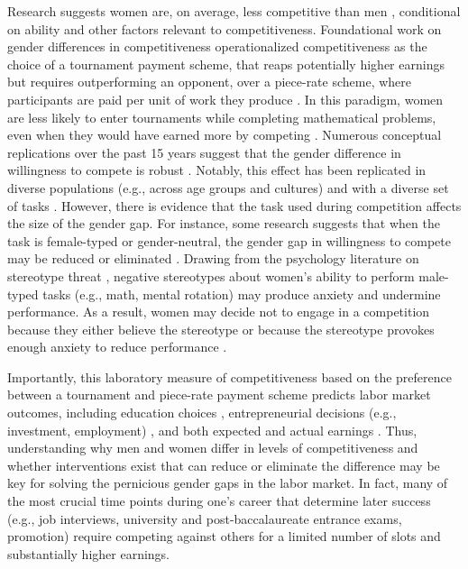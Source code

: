\documentclass[a4paper, nobind]{templates/ociamthesis}
\begin{document}
Research suggests women are, on average, less competitive than men \autocites[for review, see][]{Niederle2011,Croson2009,Niederle2017b,Shurchkov2018}, conditional on ability and other factors relevant to competitiveness. Foundational work on gender differences in competitiveness operationalized competitiveness as the choice of a tournament payment scheme, that reaps potentially higher earnings but requires outperforming an opponent, over a piece-rate scheme, where participants are paid per unit of work they produce \autocites{Niederle2007}[although see][ for an arguably more sensitive test of gender differences in competitiveness]{Saccardo2018}. In this paradigm, women are less likely to enter tournaments while completing mathematical problems, even when they would have earned more by competing \autocite{Niederle2007}. Numerous conceptual replications over the past 15 years suggest that the gender difference in willingness to compete is robust \autocites[see][ for review]{Niederle2011,Niederle2017a,Niederle2017b}. Notably, this effect has been replicated in diverse populations (e.g., across age groups and cultures) \autocite{Apicella2015,Buser2014,Sutter2016,Andersen2013,Buser2017b,Sutter2010,Dreber2014,Mayr2012} and with a diverse set of tasks \autocite{Apicella2015,Saccardo2018,Bjorvatn2016,Sutter2015,Frick2011,Samek2019}. However, there is evidence that the task used during competition affects the size of the gender gap. For instance, some research suggests that when the task is female-typed or gender-neutral, the gender gap in willingness to compete may be reduced or eliminated \autocite{Iriberri2017,Boschini2014,Boschini2019,Apicella2015,Grosse2010,Gunther2010,Dreber2014,Dreber2011,Shurchkov2012}. Drawing from the psychology literature on stereotype threat \autocite{Steele1997,Spencer1999,Spencer2016}, negative stereotypes about women's ability to perform male-typed tasks (e.g., math, mental rotation) may produce anxiety and undermine performance. As a result, women may decide not to engage in a competition because they either believe the stereotype or because the stereotype provokes enough anxiety to reduce performance \autocite{Gunther2010,Grosse2010,Iriberri2017,Shurchkov2012}.

Importantly, this laboratory measure of competitiveness based on the preference between a tournament and piece-rate payment scheme predicts labor market outcomes, including education choices \autocite{Buser2014,Zhang2012,Buser2017c,Buser2017b}, entrepreneurial decisions (e.g., investment, employment) \autocite{Berge2015}, and both expected and actual earnings \autocite{Reuben2015,Reuben2017}. Thus, understanding why men and women differ in levels of competitiveness and whether interventions exist that can reduce or eliminate the difference may be key for solving the pernicious gender gaps in the labor market. In fact, many of the most crucial time points during one's career that determine later success (e.g., job interviews, university and post-baccalaureate entrance exams, promotion) require competing against others for a limited number of slots and substantially higher earnings.
\end{document}
